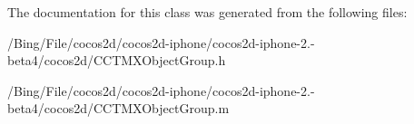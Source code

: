 The documentation for this class was generated from the following files\-:\begin{DoxyCompactItemize}
\item 
/\-Bing/\-File/cocos2d/cocos2d-\/iphone/cocos2d-\/iphone-\/2.-\/beta4/cocos2d/C\-C\-T\-M\-X\-Object\-Group.\-h\item 
/\-Bing/\-File/cocos2d/cocos2d-\/iphone/cocos2d-\/iphone-\/2.-\/beta4/cocos2d/C\-C\-T\-M\-X\-Object\-Group.\-m\end{DoxyCompactItemize}
